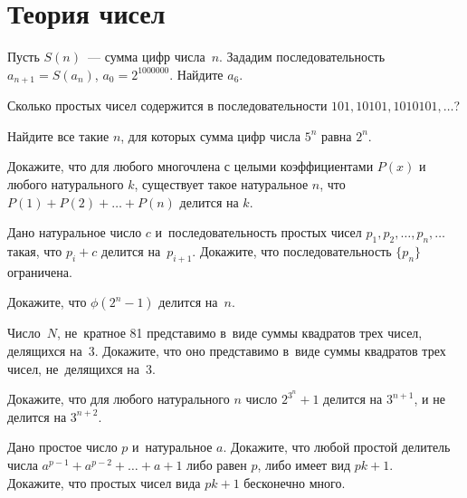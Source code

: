 
\section*{Теория чисел}


\begin{problems}

\item
Пусть $S(n)$~--- сумма цифр числа~$n$.
Зададим последовательность $a_{n+1} = S(a_n)$, $a_0 = 2^{1000000}$.
Найдите $a_6$.

\item
Сколько простых чисел содержится в последовательности
$101, 10101, 1010101, \ldots$?

\item
Найдите все такие $n$, для которых сумма цифр числа $5^n$ равна $2^n$.

\item
Докажите, что для любого многочлена с целыми коэффициентами $P(x)$ и любого
натурального $k$, существует такое натуральное $n$, что
$P(1) + P(2) + \ldots + P(n)$ делится на $k$.

\item
Дано натуральное число $c$ и~последовательность простых чисел
$p_1, p_2, \ldots, p_n, \ldots$ такая, что $p_i + c$ делится на~$p_{i+1}$.
Докажите, что последовательность $\{p_n\}$ ограничена.

\item
Докажите, что $\phi(2^n - 1)$ делится на~$n$.

\item
Число~$N$, не~кратное 81 представимо в~виде суммы квадратов трех чисел,
делящихся на~3.
Докажите, что оно представимо в~виде суммы квадратов трех чисел, не~делящихся
на~3.

\item
Докажите, что для любого натурального $n$ число $2^{3^n} + 1$ делится
на $3^{n+1}$, и не делится на $3^{n+2}$.

\item
\sp
Дано простое число $p$ и~натуральное $a$.
Докажите, что любой простой делитель числа $a^{p-1} + a^{p-2} + \ldots + a + 1$
либо равен $p$, либо имеет вид $p k + 1$.
\\
\sp
Докажите, что простых чисел вида $p k + 1$ бесконечно много.

\end{problems}

